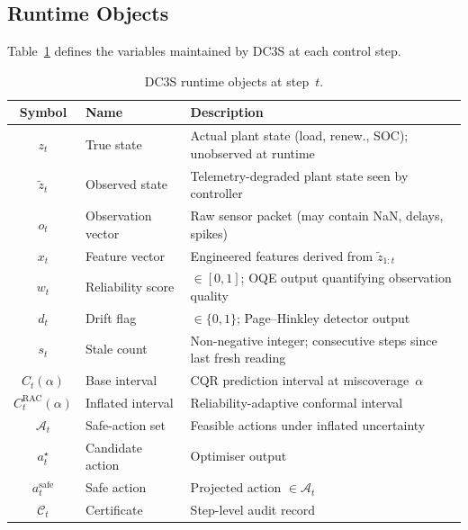 \subsection{Runtime Objects}
\label{sec:runtime-objects}

Table~\ref{tab:runtime-objects} defines the variables maintained by DC3S at
each control step.

\begin{table}[ht]
\centering
\caption{DC3S runtime objects at step~$t$.}
\label{tab:runtime-objects}
\begin{tabular}{cll}
\toprule
\textbf{Symbol} & \textbf{Name} & \textbf{Description} \\
\midrule
$z_t$            & True state          & Actual plant state (load, renew., SOC);
                                         unobserved at runtime \\
$\tilde{z}_t$    & Observed state      & Telemetry-degraded plant state seen by
                                         controller \\
$o_t$            & Observation vector  & Raw sensor packet (may contain NaN,
                                         delays, spikes) \\
$x_t$            & Feature vector      & Engineered features derived from
                                         $\tilde{z}_{1:t}$ \\
$w_t$            & Reliability score   & $\in [0,1]$; OQE output quantifying
                                         observation quality \\
$d_t$            & Drift flag          & $\in \{0,1\}$; Page--Hinkley detector
                                         output \\
$s_t$            & Stale count         & Non-negative integer; consecutive steps
                                         since last fresh reading \\
$C_t(\alpha)$    & Base interval       & CQR prediction interval at
                                         miscoverage~$\alpha$ \\
$C_t^{\mathrm{RAC}}(\alpha)$ & Inflated interval &
                   Reliability-adaptive conformal interval \\
$\mathcal{A}_t$  & Safe-action set     & Feasible actions under inflated
                                         uncertainty \\
$a_t^\star$      & Candidate action    & Optimiser output \\
$a_t^{\mathrm{safe}}$ & Safe action    & Projected action $\in \mathcal{A}_t$ \\
$\mathcal{C}_t$  & Certificate         & Step-level audit record \\
\bottomrule
\end{tabular}
\end{table}

